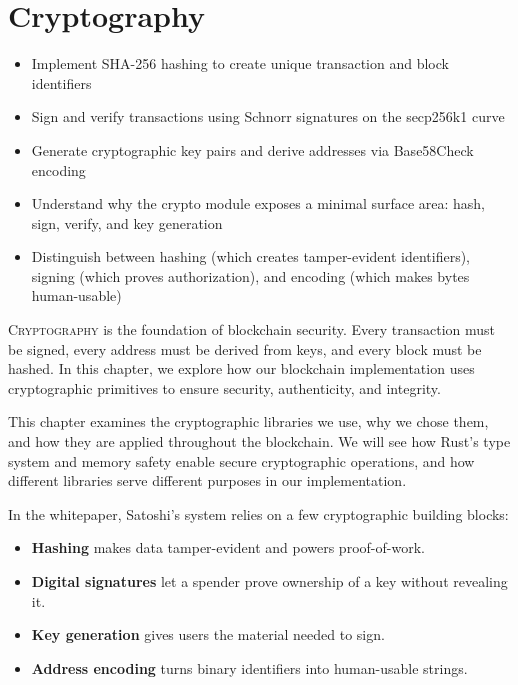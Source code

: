 \chapter{Cryptography}
\label{ch:cryptography}

\begin{learnbox}
\begin{itemize}
  \item Implement SHA-256 hashing to create unique transaction and block identifiers
  \item Sign and verify transactions using Schnorr signatures on the secp256k1 curve
  \item Generate cryptographic key pairs and derive addresses via Base58Check encoding
  \item Understand why the crypto module exposes a minimal surface area: hash, sign, verify, and key generation
  \item Distinguish between hashing (which creates tamper-evident identifiers), signing (which proves authorization), and encoding (which makes bytes human-usable)
\end{itemize}
\end{learnbox}

\lettrine{C}{ryptography} is the foundation of blockchain security. Every transaction must be signed, every address must be derived from keys, and every block must be hashed. In this chapter, we explore how our blockchain implementation uses cryptographic primitives to ensure security, authenticity, and integrity.

This chapter examines the cryptographic libraries we use, why we chose them, and how they are applied throughout the blockchain. We will see how Rust's type system and memory safety enable secure cryptographic operations, and how different libraries serve different purposes in our implementation.

In the whitepaper, Satoshi's system relies on a few cryptographic building blocks:

\begin{itemize}
  \item \textbf{Hashing} makes data tamper-evident and powers proof-of-work.
  \item \textbf{Digital signatures} let a spender prove ownership of a key without revealing it.
  \item \textbf{Key generation} gives users the material needed to sign.
  \item \textbf{Address encoding} turns binary identifiers into human-usable strings.
\end{itemize}

